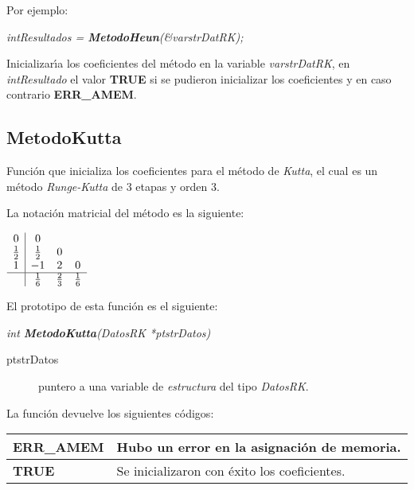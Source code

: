 Por ejemplo:

\begin{center}
\emph{intResultados = \textbf{MetodoHeun}(\&varstrDatRK);}
\end{center}

Inicializar\'{\i}a los coeficientes del m\'etodo en la variable
\emph{varstrDatRK}, en \emph{intResultado} el valor \textbf{TRUE} si se pudieron
inicializar los coeficientes y en caso contrario \textbf{ERR\_AMEM}.

\subsection{MetodoKutta}

Funci\'on que inicializa los coeficientes para el m\'etodo de \emph{Kutta}, el
cual es un m\'etodo \emph{Runge-Kutta} de $3$ etapas y orden $3$.\newline

La notaci\'on matricial del m\'etodo es la siguiente:

\begin{center}
$
\begin{array}{c|ccc}
0 & 0 \\
\frac{1}{2} & \frac{1}{2} & 0 \\
1 & -1 & 2 & 0 \\
\hline
 & \frac{1}{6} & \frac{2}{3} & \frac{1}{6}
\end{array}
$
\end{center}

El prototipo de esta funci\'on es el siguiente:

\begin{center}
\emph{int \textbf{MetodoKutta}(DatosRK *ptstrDatos)}
\end{center}

\begin{description}
\item[ptstrDatos] puntero a una variable de \emph{estructura} del tipo
\emph{DatosRK}.
\end{description}

La funci\'on devuelve los siguientes c\'odigos:

\begin{center}
\begin{tabular}{|l|l|}
\hline
\textbf{ERR\_AMEM} & Hubo un error en la asignaci\'on de memoria. \\
\hline
\textbf{TRUE} & Se inicializaron con \'exito los coeficientes. \\
\hline
\end{tabular}
\end{center}

